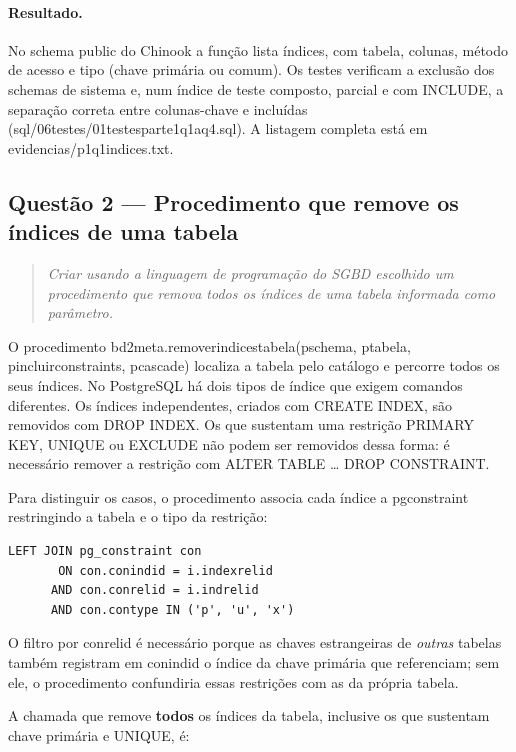 \documentclass[11pt,a4paper]{article}
\newcommand{\cod}[1]{{\ttfamily\renewcommand{\_}{\textunderscore\allowbreak}#1}}
\newenvironment{enunciado}{\begin{quote}\small\itshape}{\end{quote}}
\begin{document}
\paragraph{Resultado.} No schema \cod{public} do Chinook a função lista \numIndicesPublic{} índices, com tabela,
colunas, método de acesso e tipo (chave primária ou comum). Os testes verificam a exclusão dos schemas de sistema
e, num índice de teste composto, parcial e com \cod{INCLUDE}, a separação correta entre colunas-chave e incluídas
(\cod{sql/06\_testes/01\_testes\_parte1\_q1\_a\_q4.sql}). A listagem completa está em
\cod{evidencias/p1\_q1\_indices.txt}.

\subsection{Questão 2 --- Procedimento que remove os índices de uma tabela}

\begin{enunciado}
Criar usando a linguagem de programação do SGBD escolhido um procedimento que remova todos os índices de uma
tabela informada como parâmetro.
\end{enunciado}

O procedimento \cod{bd2\_meta.remover\_indices\_tabela(p\_schema, p\_tabela, p\_incluir\_constraints, p\_cascade)}
localiza a tabela pelo catálogo e percorre todos os seus índices. No PostgreSQL há dois tipos de índice que
exigem comandos diferentes. Os índices independentes, criados com \cod{CREATE INDEX}, são removidos com
\cod{DROP INDEX}. Os que sustentam uma restrição \cod{PRIMARY KEY}, \cod{UNIQUE} ou \cod{EXCLUDE} não podem ser
removidos dessa forma: é necessário remover a restrição com \cod{ALTER TABLE \dots{} DROP CONSTRAINT}.

Para distinguir os casos, o procedimento associa cada índice a \cod{pg\_constraint} restringindo a tabela e o tipo
da restrição:

\begin{lstlisting}
LEFT JOIN pg_constraint con
       ON con.conindid = i.indexrelid
      AND con.conrelid = i.indrelid
      AND con.contype IN ('p', 'u', 'x')
\end{lstlisting}

O filtro por \cod{conrelid} é necessário porque as chaves estrangeiras de \emph{outras} tabelas também registram
em \cod{conindid} o índice da chave primária que referenciam; sem ele, o procedimento confundiria essas restrições
com as da própria tabela.

A chamada que remove \textbf{todos} os índices da tabela, inclusive os que sustentam chave primária e
\cod{UNIQUE}, é:
\end{document}
